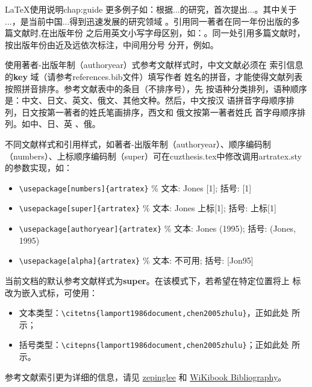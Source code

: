 \begin{cuzchapter}{\LaTeX{}使用说明}{chap:guide}
	更多例子如：\citet{walls2013drought}根据...的研究，首次提出...。其中关于
	...\citep{walls2013drought}，是当前中国...得到迅速发展的研究领域
	\citep{chen1980zhongguo}。引用同一著者在同一年份出版的多篇文献时,在出版年份
	之后用英文小写字母区别，如：\citep{yuan2012lana, yuan2012lanb,
		yuan2012lanc}。同一处引用多篇文献时，按出版年份由近及远依次标注，中间用分号
	分开，例如\citep{chen1980zhongguo, stamerjohanns2009mathml, hls2012jinji,
		niu2013zonghe}。

	使用著者-出版年制（authoryear）式参考文献样式时，中文文献必须在
	索引信息的\textbf{key} 域（请参考references.bib文件）填写作者
	姓名的拼音，才能使得文献列表按照拼音排序。参考文献表中的条目（不排序号），先
	按语种分类排列，语种顺序是：中文、日文、英文、俄文、其他文种。然后，中文按汉
	语拼音字母顺序排列，日文按第一著者的姓氏笔画排序，西文和 俄文按第一著者姓氏
	首字母顺序排列。如中\citep{niu2013zonghe}、日\citep{Bohan1928}、英
	\citep{stamerjohanns2009mathml}、俄\citep{Dubrovin1906}。

	不同文献样式和引用样式，如著者-出版年制（authoryear）、顺序编码制
	（numbers）、上标顺序编码制（super）可在cuzthesis.tex中修改调用artratex.sty
	的参数实现，如：
	\begin{itemize}
		\item \verb+\usepackage[numbers]{artratex}+ $\%$ 文本: Jones [1]; 括号: [1]
		\item \verb+\usepackage[super]{artratex}+ $\%$ 文本: Jones 上标[1]; 括号: 上标[1]
		\item \verb+\usepackage[authoryear]{artratex}+ $\%$ 文本: Jones (1995); 括号: (Jones, 1995)
		\item \verb+\usepackage[alpha]{artratex}+ $\%$ 文本: 不可用; 括号: [Jon95]
	\end{itemize}

	当前文档的默认参考文献样式为\textbf{super}。在该模式下，若希望在特定位置将上
	标改为嵌入式标，可使用：

	\begin{itemize}
		\item 文本类型：\verb|\citetns{lamport1986document,chen2005zhulu}|，正如此处
		      所示；
		\item 括号类型：\verb|\citepns{lamport1986document,chen2005zhulu}|；正如此处
		      所示。
	\end{itemize}

	参考文献索引更为详细的信息，请见
	\href{https://github.com/zepinglee/gbt7714-bibtex-style}{zepinglee} 和
	\href{https://en.wikibooks.org/wiki/LaTeX/Bibliography_Management}{WiKibook
		Bibliography}。


\end{cuzchapter}
